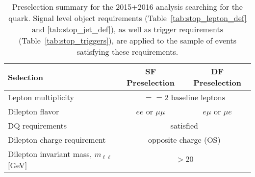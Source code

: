 \begin{table}[!htb]
    \begin{center}
        \begin{tabular}{l|c| c}
            \hline
            \hline
            \textbf{Selection} & \textbf{SF Preselection} & \textbf{DF Preselection} \\
            \hline
            Lepton multiplicity & \multicolumn{2}{c}{$==2$ baseline leptons} \\
            Dilepton flavor & $ee$ or $\mu \mu$ & $e\mu$ or $\mu e$ \\
            DQ requirements & \multicolumn{2}{c}{satisfied} \\
            Dilepton charge requirement & \multicolumn{2}{c}{opposite charge (OS)} \\
            Dilepton invariant mass, $m_{\ell\ell}$ [GeV] & \multicolumn{2}{c}{$>20$} \\
            \hline
            \hline
        \end{tabular}
        \caption{
            Preselection summary for the 2015+2016 analysis searching for the \stopone quark.
            Signal level object requirements (Table~\ref{tab:stop_lepton_def} and \ref{tab:stop_jet_def}), as well as trigger requirements
            (Table~\ref{tab:stop_triggers}), are applied
            to the sample of events satisfying these requirements.
        }
        \label{tab:stop_preselection}
    \end{center}
\end{table}
